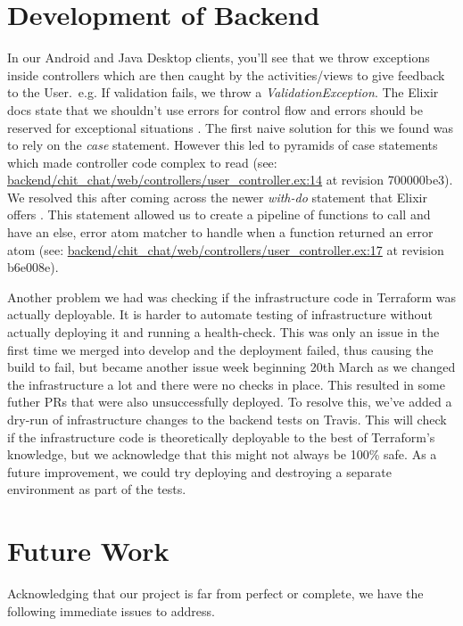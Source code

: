 \documentclass[11pt,a4paper]{report}
\begin{document}
\section{Development of Backend}

In our Android and Java Desktop clients, you'll see that we throw exceptions inside controllers which are then caught by the activities/views to give feedback to the User.\ e.g. If validation fails, we throw a \emph{ValidationException}. The Elixir docs state that we shouldn't use errors for control flow and errors should be reserved for exceptional situations \cite{website:elixir_error_flow}. The first naive solution for this we found was to rely on the \emph{case} statement. However this led to pyramids of case statements which made controller code complex to read (see: \url{backend/chit_chat/web/controllers/user_controller.ex:14} at revision 700000be3). We resolved this after coming across the newer \emph{with-do} statement that Elixir offers \cite{website:elixir_with}. This statement allowed us to create a pipeline of functions to call and have an else, error atom matcher to handle when a function returned an error atom (see: \url{backend/chit_chat/web/controllers/user_controller.ex:17} at revision b6e008e).

Another problem we had was checking if the infrastructure code in Terraform was actually deployable. It is harder to automate testing of infrastructure without actually deploying it and running a health-check. This was only an issue in the first time we merged into develop and the deployment failed, thus causing the build to fail, but became another issue week beginning 20th March as we changed the infrastructure a lot and there were no checks in place. This resulted in some futher PRs that were also unsuccessfully deployed. To resolve this, we've added a dry-run of infrastructure changes to the backend tests on Travis. This will check if the infrastructure code is theoretically deployable to the best of Terraform's knowledge, but we acknowledge that this might not always be 100\% safe. As a future improvement, we could try deploying and destroying a separate environment as part of the tests.

\section{Future Work}

Acknowledging that our project is far from perfect or complete, we have the following immediate issues to address.
\end{document}
